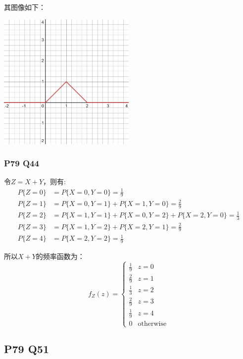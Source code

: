 \documentclass[a4paper,12pt]{ctexart}
\begin{document}
其图像如下：
\begin{center}
	\includegraphics[width=0.5\textwidth]{Plot 1.png}
\end{center}

\subsubsection*{P79 Q44}

令$Z = X + Y$，则有:
\begin{align*}
	P\{Z = 0\} &= P\{X = 0, Y = 0\} = \frac{1}{9} \\
	P\{Z = 1\} &= P\{X = 0, Y = 1\} + P\{X = 1, Y = 0\} = \frac{2}{9} \\
	P\{Z = 2\} &= P\{X = 1, Y = 1\} + P\{X = 0, Y = 2\} + P\{X = 2, Y = 0\} = \frac{1}{3} \\
	P\{Z = 3\} &= P\{X = 1, Y = 2\} + P\{X = 2, Y = 1\} = \frac{2}{9} \\
	P\{Z = 4\} &= P\{X = 2, Y = 2\} = \frac{1}{9}
\end{align*}

所以$X+Y$的频率函数为：
\begin{equation*}
	f_Z(z) = 
	\begin{cases}
		\frac{1}{9} & z = 0 \\
		\frac{2}{9} & z = 1 \\
		\frac{1}{3} & z = 2 \\
		\frac{2}{9} & z = 3 \\
		\frac{1}{9} & z = 4 \\
		0 & \text{otherwise}
	\end{cases}
\end{equation*}

\subsection*{P79 Q51}
\end{document}
